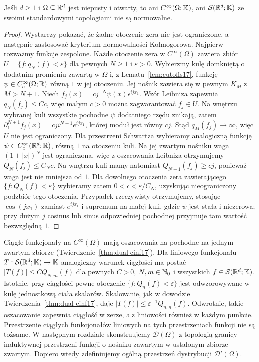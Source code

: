 \begin{stwierdzenie}
\label{prop:non-normable17}
Jeśli $d\ge1$ i $\Omega\subseteq\mathbb R^d$ jest niepusty i otwarty,
to ani $C^\infty(\Omega;\mathbb K)$, ani $\mathcal S(\mathbb R^d;\mathbb K)$
ze swoimi standardowymi topologiami nie są normowalne.
\end{stwierdzenie}
\begin{proof}
Wystarczy pokazać, że żadne otoczenie zera nie jest ograniczone,
a następnie zastosować kryterium normowalności Kolmogorowa.
Najpierw rozważmy funkcje zespolone. Każde otoczenie zera
w $C^\infty(\Omega)$ zawiera zbiór $U=\{f:q_N(f)<\varepsilon\}$
dla pewnych $N\ge1$ i $\varepsilon>0$.
Wybierzmy kulę domkniętą o dodatnim promieniu zawartą w $\Omega$
i, z Lematu~\ref{lem:cutoffs17}, funkcję
$\psi\in C_c^\infty(\Omega;\mathbb R)$ równą $1$ w jej otoczeniu.
Jej nośnik zawiera się w pewnym $K_M$ z $M>N+1$.
Niech $f_j(x)=c j^{-N}\psi(x)e^{ijx_1}$.
Wzór Leibniza zapewnia $q_N(f_j)\le Cc$,
więc małym $c>0$ można zagwarantować $f_j\in U$.
Na wnętrzu wybranej kuli wszystkie pochodne $\psi$
dodatniego rzędu znikają, zatem
$\partial_1^{N+1}f_j(x)=c j i^{N+1}e^{ijx_1}$,
której moduł jest równy $cj$. Stąd
$q_M(f_j)\to\infty$, więc $U$ nie jest ograniczony.
Dla przestrzeni Schwartza wybieramy analogiczną funkcję
$\psi\in C_c^\infty(\mathbb R^d;\mathbb R)$, równą $1$ na otoczeniu kuli.
Na jej zwartym nośniku waga $(1+|x|)^N$ jest ograniczona,
więc z oszacowania Leibniza otrzymujemy $Q_N(f_j)\le C_Nc$.
Na wnętrzu kuli mamy natomiast
$Q_{N+1}(f_j)\ge cj$, ponieważ waga jest nie mniejsza od $1$.
Dla dowolnego otoczenia zera zawierającego
$\{f:Q_N(f)<\varepsilon\}$ wybieramy zatem
$0<c<\varepsilon/C_N$, uzyskując nieograniczony podzbiór
tego otoczenia.
Przypadek rzeczywisty otrzymujemy, stosując
$\cos(jx_1)$ zamiast $e^{ijx_1}$ i supremum na małej kuli,
gdzie $\psi$ jest stała i niezerowa; przy dużym $j$
cosinus lub sinus odpowiedniej pochodnej przyjmuje tam
wartość bezwzględną $1$.
\end{proof}

\begin{uwaga}
\label{rem:distribution-next17}
Ciągłe funkcjonały na $C^\infty(\Omega)$ mają oszacowania
na pochodne na jednym zwartym zbiorze (Twierdzenie~\ref{thm:dual-cinf17}).
Dla liniowego funkcjonału $T:\mathcal S(\mathbb R^d;\mathbb K)\to\mathbb K$
analogiczny warunek ciągłości ma postać
$|T(f)|\le C Q_{N,m}(f)$ dla pewnych $C>0$, $N,m\in\mathbb N_0$
i wszystkich $f\in\mathcal S(\mathbb R^d;\mathbb K)$.
Istotnie, przy ciągłości pewne otoczenie
$\{f:Q_n(f)<\varepsilon\}$ jest odwzorowywane w kulę jednostkową
ciała skalarów. Skalowanie, jak w dowodzie
Twierdzenia~\ref{thm:dual-cinf17}, daje
$|T(f)|\le\varepsilon^{-1}Q_{n,n}(f)$.
Odwrotnie, takie oszacowanie zapewnia ciągłość w zerze,
a z liniowości również w każdym punkcie.
Przestrzenie ciągłych funkcjonałów liniowych na tych
przestrzeniach funkcji nie są tożsame.
W następnym rozdziale skonstruujemy $\mathcal D(\Omega)$
z topologią granicy induktywnej przestrzeni funkcji o nośniku
zawartym w ustalonym zbiorze zwartym. Dopiero wtedy zdefiniujemy
ogólną przestrzeń dystrybucji $\mathcal D'(\Omega)$.
\end{uwaga}
